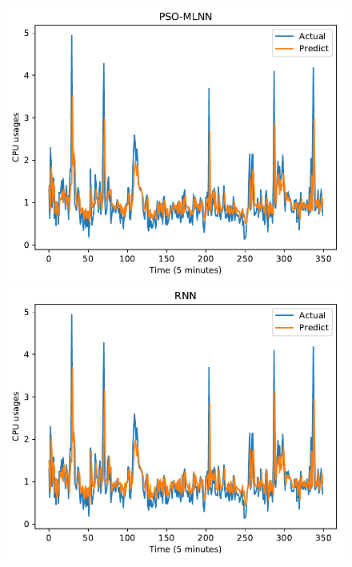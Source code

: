 \documentclass[11pt,twoside]{article}
\begin{document}
\begin{multicols}{2}
\begin{figure}[!ht] 
  \begin{minipage}[b]{0.33\linewidth}
    \centering
    \includegraphics[width=0.9\linewidth]{images/pdf/predict/k2/cpu_k2_pso_mlnn.pdf} 
  \end{minipage}
  \begin{minipage}[b]{0.33\linewidth}
    \centering
    \includegraphics[width=0.9\linewidth]{images/pdf/predict/k2/cpu_k2_rnn.pdf} 
  \end{minipage} 
  \begin{minipage}[b]{0.33\linewidth}
    \centering

\end{minipage}
\end{figure}
\end{multicols}
\end{document}
